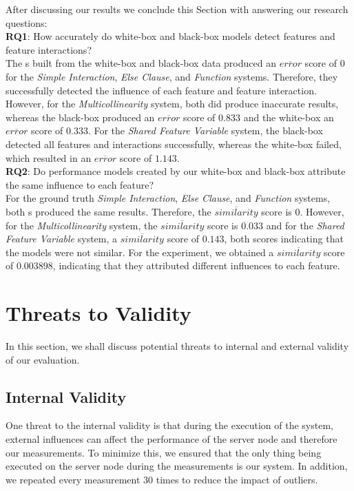 After discussing our results we conclude this Section with answering our research questions: \\

\noindent \textbf{RQ1}: How accurately do white-box and black-box models detect features and feature interactions? \\

\noindent The {\perfInfluenceModel}s built from the white-box and black-box data produced an $\overline{error}$ score of $0$ 
for the \emph{Simple Interaction}, \emph{Else Clause}, and \emph{Function} systems. Therefore, they successfully
detected the influence of each feature and feature interaction. 
However, for the \emph{Multicollinearity} system, both did produce inaccurate results, 
whereas the black-box produced an $\overline{error}$ score of $0.833$ and the white-box an $\overline{error}$ score of $0.333$. 
For the \emph{Shared Feature Variable} system, the black-box detected all features and interactions successfully, 
whereas the white-box failed, which resulted in an $\overline{error}$ score of $1.143$.
\\

\noindent \textbf{RQ2}: Do performance models created by our white-box and black-box attribute the same influence to each feature?\\

\noindent For the ground truth \emph{Simple Interaction}, \emph{Else Clause}, and \emph{Function} systems, 
both {\perfInfluenceModel}s produced the same results. Therefore, the $\overline{similarity}$ score is $0$.
However, for the \emph{Multicollinearity} system, the $\overline{similarity}$ score is $0.033$ and for the \emph{Shared Feature Variable} system,
a $\overline{similarity}$ score of $0.143$, both scores indicating that the models were not similar.
For the experiment, we obtained a $\overline{similarity}$ score of $0.003898$, indicating that they attributed different influences to each feature.

\section{Threats to Validity}\label{sec:threats}

In this section, we shall discuss potential threats to internal and external validity of our evaluation.

\subsection*{Internal Validity}
One threat to the internal validity is that during the execution of the system, 
external influences can affect the performance of the server node and therefore our measurements. 
To minimize this, we ensured that the only thing being executed on the server node during the measurements is our system. 
In addition, we repeated every measurement $30$ times to reduce the impact of outliers.  

